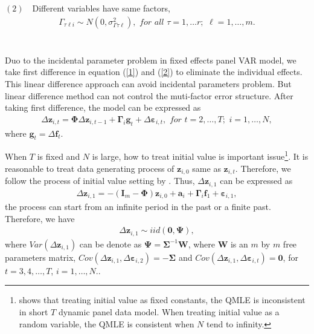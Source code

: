 \documentclass[12pt,a4paper,hyperref]{article}
\begin{document}
$(2)$ \,\, Different variables have same factors,
\begin{align*}
\Gamma_{\tau \ell i}\sim N\left(0,\sigma^{2}_{\Gamma \tau \ell}  \right), \,\, for \,\, all \,\,\tau=1,\ldots r ;\,\, \ell=1,\ldots, m.
\end{align*}
\\ \\
Duo to the incidental parameter problem in fixed effects panel VAR model, we take first difference in equation (\ref{1}) and (\ref{2})  to eliminate the individual effects. This linear difference approach can avoid incidental parameters problem. But linear difference method can not control the muti-factor error structure.  After taking first difference, the model can be expressed as
\begin{align}
\Delta \boldsymbol{z}_{i,t}=\boldsymbol{\Phi} \Delta \boldsymbol{z}_{i,t-1}+\boldsymbol{\Gamma}_{i}\boldsymbol{g}_{t} +\Delta \boldsymbol{\varepsilon}_{i,t}, \,\, for \,\, t=2,\ldots, T;\,\,i=1,\ldots,N, \label{4}
\end{align}
where
 $\boldsymbol{g}_{t}=\Delta \boldsymbol{f}_{t}$.



When $T$ is fixed and $N$ is large, how to treat initial value is important issue\footnote{\citet{HsiaoZhou:2018} shows that treating initial value as fixed constants, the QMLE is inconsistent in short $T$ dynamic panel data model. When treating initial value as a random variable, the QMLE is consistent when $N$ tend to infinity. }.
It is reasonable to treat data generating process of $\boldsymbol{z}_{i,0}$  same as $\boldsymbol{z}_{i,t}$.
Therefore,  we follow the process of initial value setting by \citet{Binder:2005}.
 Thus, $\Delta \boldsymbol{z}_{i,1}$ can be expressed as
\begin{align}
\Delta \boldsymbol{z}_{i,1}=-(\boldsymbol{I}_{m}-\boldsymbol{\Phi})\boldsymbol{z}_{i,0} +\boldsymbol{a}_{i}+\boldsymbol{\Gamma}_{i}\boldsymbol{f}_{1} + \boldsymbol{\varepsilon}_{i,1}, \label{6}
\end{align}
the process can start from an infinite period in the past or  a finite past.
Therefore, we have
\begin{align}
\Delta \boldsymbol{z}_{i,1}\sim iid(\boldsymbol{0},\boldsymbol{\Psi}),
\end{align}
 where $Var\left(\Delta \boldsymbol{z}_{i,1} \right)$ can be denote as $\boldsymbol{\Psi}=\boldsymbol{\Sigma}^{-1}\boldsymbol{W} $, where $\boldsymbol{W}$ is an $m$ by $m$ free parameters matrix, $Cov\left(\Delta \boldsymbol{z}_{i,1},\Delta \boldsymbol{\varepsilon}_{i,2} \right)=-\boldsymbol{\Sigma}$ and $Cov \left(\Delta \boldsymbol{z}_{i,1},\Delta \boldsymbol{\varepsilon}_{i,t} \right)=\boldsymbol{0}$, for $t=3,4,\ldots,T$, $i=1,\ldots,N.$.
\end{document}
